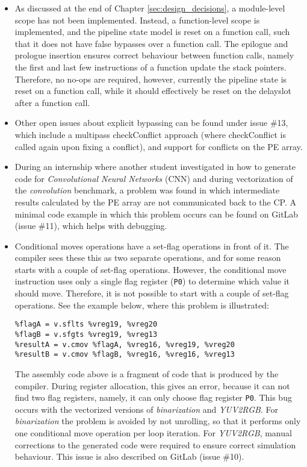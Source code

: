 \begin{itemize}
    \item As discussed at the end of Chapter \ref{sec:design_decisions}, a module-level scope has not been implemented. Instead, a function-level scope is implemented, and the pipeline state model is reset on a function call, such that it does not have false bypasses over a function call. The epilogue and prologue insertion ensures correct behaviour between function calls, namely the first and last few instructions of a function update the stack pointers. Therefore, no no-ops are required, however, currently the pipeline state is reset on a function call, while it should effectively be reset on the delayslot after a function call.
    \item Other open issues about explicit bypassing can be found under issue \#13, which include a multipass checkConflict approach (where checkConflict is called again upon fixing a conflict), and support for conflicts on the PE array.
    \item During an internship where another student investigated in how to generate code for \emph{Convolutional Neural Networks} (CNN) and during vectorization of the \emph{convolution} benchmark, a problem was found in which intermediate results calculated by the PE array are not communicated back to the CP. A minimal code example in which this problem occurs can be found on GitLab (issue \#11), which helps with debugging.
    \item Conditional moves operations have a set-flag operations in front of it. The compiler sees these this as two separate operations, and for some reason starts with a couple of set-flag operations. However, the conditional move instruction uses only a single flag register (\texttt{P0}) to determine which value it should move. Therefore, it is not possible to start with a couple of set-flag operations. See the example below, where this problem is illustrated:
\lstset{style=customasm}
\begin{lstlisting}
%flagA = v.sflts %vreg19, %vreg20
%flagB = v.sfgts %vreg19, %vreg13
%resultA = v.cmov %flagA, %vreg16, %vreg19, %vreg20
%resultB = v.cmov %flagB, %vreg16, %vreg16, %vreg13
\end{lstlisting}
The assembly code above is a fragment of code that is produced by the compiler. During register allocation, this gives an error, because it can not find two flag registers, namely, it can only choose flag register \texttt{P0}. This bug occurs with the vectorized versions of \emph{binarization} and \emph{YUV2RGB}. For \emph{binarization} the problem is avoided by not unrolling, so that it performs only one conditional move operation per loop iteration. For \emph{YUV2RGB}, manual corrections to the generated code were required to ensure correct simulation behaviour. This issue is also described on GitLab (issue \#10).
\end{itemize}

